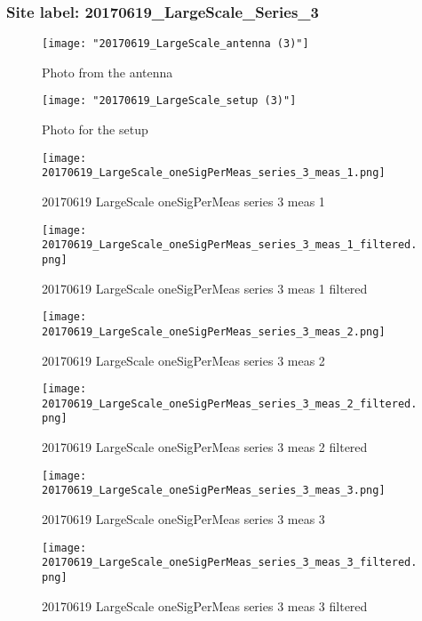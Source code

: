 \subsubsection{Site label: 20170619\_LargeScale\_Series\_3}
\begin{figure}[ht] \caption{Photo from the antenna}
\texttt{[image: "20170619\_LargeScale\_antenna (3)"]}\centering\end{figure}
\begin{figure}[ht] \caption{Photo for the setup}
\texttt{[image: "20170619\_LargeScale\_setup (3)"]}\centering\end{figure}
\begin{figure}[ht] \caption{20170619 LargeScale oneSigPerMeas series 3 meas 1}
\texttt{[image: 20170619\_LargeScale\_oneSigPerMeas\_series\_3\_meas\_1.png]}\centering\end{figure}
\begin{figure}[ht] \caption{20170619 LargeScale oneSigPerMeas series 3 meas 1 filtered}
\texttt{[image: 20170619\_LargeScale\_oneSigPerMeas\_series\_3\_meas\_1\_filtered.png]}\centering\end{figure}
\begin{figure}[ht] \caption{20170619 LargeScale oneSigPerMeas series 3 meas 2}
\texttt{[image: 20170619\_LargeScale\_oneSigPerMeas\_series\_3\_meas\_2.png]}\centering\end{figure}
\begin{figure}[ht] \caption{20170619 LargeScale oneSigPerMeas series 3 meas 2 filtered}
\texttt{[image: 20170619\_LargeScale\_oneSigPerMeas\_series\_3\_meas\_2\_filtered.png]}\centering\end{figure}
\begin{figure}[ht] \caption{20170619 LargeScale oneSigPerMeas series 3 meas 3}
\texttt{[image: 20170619\_LargeScale\_oneSigPerMeas\_series\_3\_meas\_3.png]}\centering\end{figure}
\begin{figure}[ht] \caption{20170619 LargeScale oneSigPerMeas series 3 meas 3 filtered}
\texttt{[image: 20170619\_LargeScale\_oneSigPerMeas\_series\_3\_meas\_3\_filtered.png]}\centering\end{figure}
\clearpage
